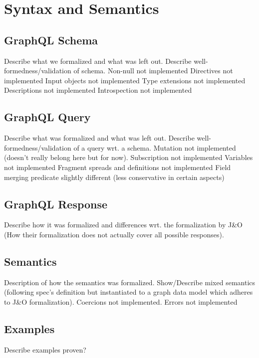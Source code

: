 
\section{Syntax and Semantics}

\subsection{GraphQL Schema}
Describe what we formalized and what was left out.
Describe well-formedness/validation of schema.
Non-null not implemented
Directives not implemented
Input objects not implemented
Type extensions not implemented
Descriptions not implemented
Introspection not implemented

\subsection{GraphQL Query}
Describe what was formalized and what was left out.
Describe well-formedness/validation of a query wrt. a schema.
Mutation not implemented (doesn't really belong here but for now).
Subscription not implemented
Variables not implemented
Fragment spreads and definitions not implemented
Field merging predicate slightly different (less conservative in certain aspects)

\subsection{GraphQL Response}
Describe how it was formalized and differences wrt. the 
formalization by J\&O (How their formalization does not actually 
cover all possible responses).

\subsection{Semantics}
Description of how the semantics was formalized.
Show/Describe mixed semantics (following spec's definition
but instantiated to a graph data model which adheres to J\&O 
formalization).
Coercions not implemented.
Errors not implemented

\subsection{Examples}
Describe examples proven? 
